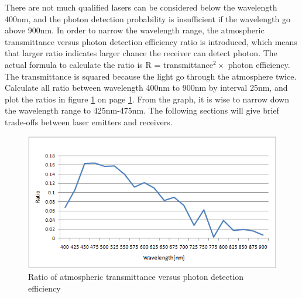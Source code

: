 There are not much qualified \acs{laser}s can be considered below the wavelength 400nm, and the photon detection probability is insufficient if the wavelength go above 900nm. In order to narrow the wavelength range, the atmospheric transmittance versus photon detection efficiency ratio is introduced, which means that larger ratio indicates larger chance the receiver can detect photon. The actual formula to calculate the ratio is R = transmittance$^{2} \times$ photon efficiency. The transmittance is squared because the light go through the atmosphere twice. Calculate all ratio between wavelength 400nm to 900nm by interval 25nm, and plot the ratios in figure \ref{fig:wavelength_estimation} on page \ref{fig:wavelength_estimation}. From the graph, it is wise to narrow down the wavelength range to 425nm-475nm.  The following sections will give brief trade-offs between \acs{laser} emitters and receivers.

\begin{figure}
\centering
\includegraphics[scale=1]{chapters/img/wavelength_estimation.png}
\caption{Ratio of atmospheric transmittance versus photon detection efficiency}
\label{fig:wavelength_estimation}
\end{figure}
